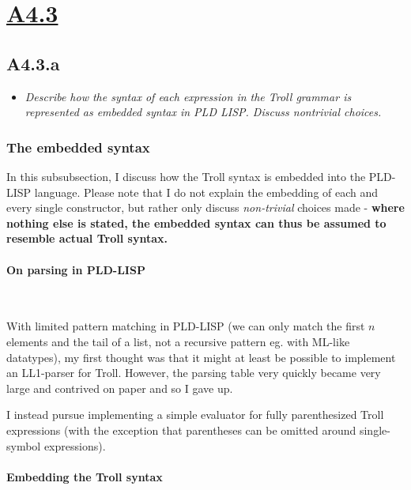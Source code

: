 \newpage
\section{\underline{A4.3}}

\subsection{A4.3.a}

\begin{itemize}
  \item \emph{Describe how the syntax of each expression in the Troll grammar is
    represented as embedded syntax in PLD LISP. Discuss nontrivial choices.}
\end{itemize}


\subsubsection{The embedded syntax}

In this subsubsection, I discuss how the Troll syntax is embedded into the
PLD-LISP language. Please note that I do not explain the embedding of each and
every single constructor, but rather only discuss \emph{non-trivial} choices
made - \textbf{where nothing else is stated, the embedded syntax can thus be assumed to
resemble actual Troll syntax.}


\paragraph{On parsing in PLD-LISP}~\smallskip

With limited pattern matching in PLD-LISP (we can only match the first $n$
elements and the tail of a list, not a recursive pattern eg. with ML-like
datatypes), my first thought was that it might at least be possible to implement
an LL1-parser for Troll. However, the parsing table very quickly became very
large and contrived on paper and so I gave up.

\smallskip

I instead pursue implementing a simple evaluator for fully parenthesized Troll
expressions (with the exception that parentheses can be omitted around
single-symbol expressions).


\paragraph{Embedding the Troll syntax}~\smallskip

